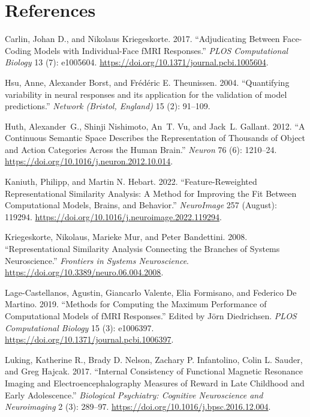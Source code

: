 \documentclass[
  letterpaper,
  DIV=11,
  numbers=noendperiod]{scrartcl}
\newlength{\cslhangindent}
\newlength{\cslentryspacingunit} %
\newenvironment{CSLReferences}[2] %
 {%
  \setlength{\parindent}{0pt}
  \ifodd #1
  \let\oldpar\par
  \def\par{\hangindent=\cslhangindent\oldpar}
  \fi
  \setlength{\parskip}{#2\cslentryspacingunit}
 }%
 {}
\begin{document}
\hypertarget{references}{%
\section{References}\label{references}}

\hypertarget{refs}{}
\begin{CSLReferences}{1}{0}
\leavevmode{}%
Carlin, Johan D., and Nikolaus Kriegeskorte. 2017. {``Adjudicating
Between Face-Coding Models with Individual-Face fMRI Responses.''}
\emph{PLOS Computational Biology} 13 (7): e1005604.
\url{https://doi.org/10.1371/journal.pcbi.1005604}.

\leavevmode{}%
Hsu, Anne, Alexander Borst, and Frédéric E. Theunissen. 2004.
{``Quantifying variability in neural responses and its application for
the validation of model predictions.''} \emph{Network (Bristol,
England)} 15 (2): 91--109.

\leavevmode{}%
Huth, Alexander~G., Shinji Nishimoto, An~T. Vu, and Jack~L. Gallant.
2012. {``A Continuous Semantic Space Describes the Representation of
Thousands of Object and Action Categories Across the Human Brain.''}
\emph{Neuron} 76 (6): 1210--24.
\url{https://doi.org/10.1016/j.neuron.2012.10.014}.

\leavevmode{}%
Kaniuth, Philipp, and Martin N. Hebart. 2022. {``Feature-Reweighted
Representational Similarity Analysis: A Method for Improving the Fit
Between Computational Models, Brains, and Behavior.''} \emph{NeuroImage}
257 (August): 119294.
\url{https://doi.org/10.1016/j.neuroimage.2022.119294}.

\leavevmode{}%
Kriegeskorte, Nikolaus, Marieke Mur, and Peter Bandettini. 2008.
{``Representational Similarity Analysis {\textendash} Connecting the
Branches of Systems Neuroscience.''} \emph{Frontiers in Systems
Neuroscience}. \url{https://doi.org/10.3389/neuro.06.004.2008}.

\leavevmode{}%
Lage-Castellanos, Agustin, Giancarlo Valente, Elia Formisano, and
Federico De Martino. 2019. {``Methods for Computing the Maximum
Performance of Computational Models of fMRI Responses.''} Edited by Jörn
Diedrichsen. \emph{PLOS Computational Biology} 15 (3): e1006397.
\url{https://doi.org/10.1371/journal.pcbi.1006397}.

\leavevmode{}%
Luking, Katherine R., Brady D. Nelson, Zachary P. Infantolino, Colin L.
Sauder, and Greg Hajcak. 2017. {``Internal Consistency of Functional
Magnetic Resonance Imaging and Electroencephalography Measures of Reward
in Late Childhood and Early Adolescence.''} \emph{Biological Psychiatry:
Cognitive Neuroscience and Neuroimaging} 2 (3): 289--97.
\url{https://doi.org/10.1016/j.bpsc.2016.12.004}.


\end{CSLReferences}
\end{document}

